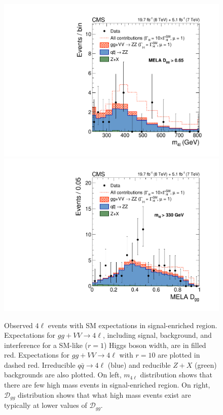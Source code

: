 \begin{figure}[htbp]
\begin{center}
\includegraphics[width=.45\linewidth]{HiggsProperties/figures/fig3a_new.pdf}
\includegraphics[width=.45\linewidth]{HiggsProperties/figures/fig3b_new.pdf}
\caption[$m_{4\ell}$ and $\mathcal{D}_{gg}$ Distributions of Expected and Observed $4\ell$ Events in the Off-Shell Signal-Enhanced Region]{Observed $4\ell$ events with SM expectations in signal-enriched region. Expectations for $gg+VV\rightarrow 4\ell$, including signal, background, and interference for a SM-like ($r=1$) Higgs boson width, are in filled red. Expectations for $gg+VV\rightarrow 4\ell$ with $r=10$ are plotted in dashed red. Irreducible $q\bar{q}\rightarrow 4\ell$ (blue) and reducible $Z+X$ (green) backgrounds are also plotted. On left, $m_{4\ell}$ distribution shows that there are few high mass events in signal-enriched region. On right, $\mathcal{D}_{gg}$ distribution shows that what high mass events exist are typically at lower values of $\mathcal{D}_{gg}$.}
\label{fig:Width4l_SignalEnriched}
\end{center}
\end{figure}

